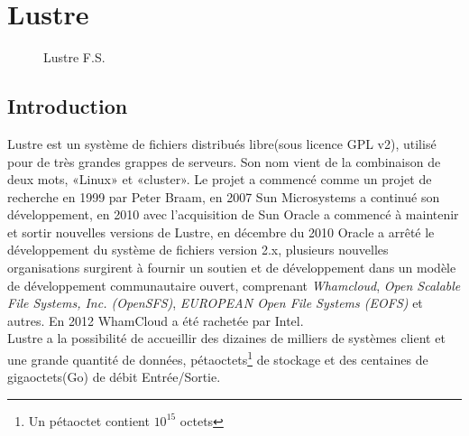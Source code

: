 \documentclass[12pt]{article}
\begin{document}
\section{Lustre}
\begin{figure}[H] 
\caption{Lustre F.S.}
\label{fig:speciation}
\end{figure}

\subsection{Introduction}
Lustre est un système de fichiers distribués libre(sous licence GPL v2), utilisé pour de très grandes grappes de serveurs. Son nom vient de la combinaison de deux mots, «Linux» et «cluster». Le projet a commencé comme un projet de recherche en 1999 par Peter Braam, en 2007 Sun Microsystems a continué son développement, en 2010 avec l'acquisition de Sun Oracle a commencé à maintenir et sortir nouvelles versions de Lustre, en décembre du 2010 Oracle a arrêté le développement du système de fichiers version 2.x, plusieurs nouvelles organisations surgirent à fournir un soutien et de développement dans un modèle de développement communautaire ouvert, comprenant \textit{Whamcloud}, \textit{Open Scalable File Systems, Inc. (OpenSFS)}, \textit{EUROPEAN Open File Systems (EOFS)} et autres. En 2012 WhamCloud a été rachetée par Intel.\\


Lustre a la possibilité de accueillir des dizaines de milliers de systèmes client et une grande quantité de données, pétaoctets\footnote{Un pétaoctet contient \begin{math}10^{15}\end{math} octets} de stockage et des centaines de gigaoctets(Go) de débit Entrée/Sortie. 
\end{document}
